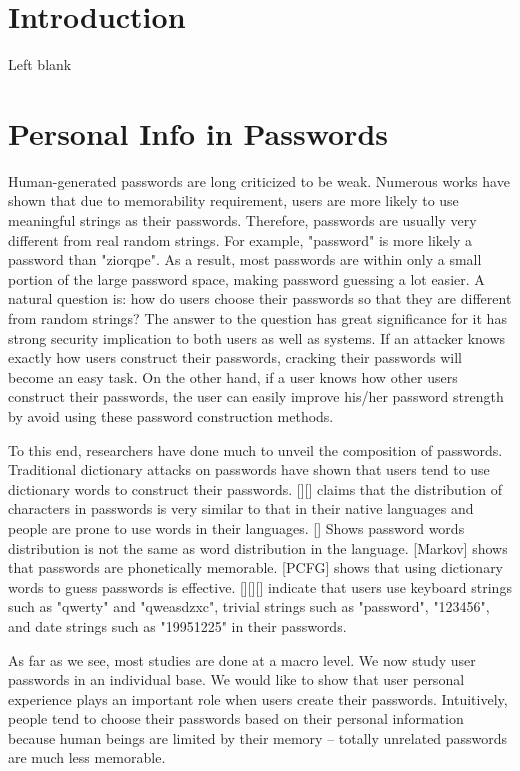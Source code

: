 \documentclass{sig-alternate}
\begin{document}


\section{Introduction}
Left blank

\section{Personal Info in Passwords}
Human-generated passwords are long criticized to be weak. Numerous works have shown that due to memorability requirement, users are more likely to use meaningful strings as their passwords. Therefore, passwords are usually very different from real random strings. For example, "password" is more likely a password than "ziorqpe". As a result, most passwords are within only a small portion of the large password space, making password guessing a lot easier. A natural question is: how do users choose their passwords so that they are different from random strings? The answer to the question has great significance for it has strong security implication to both users as well as systems. If an attacker knows exactly how users construct their passwords, cracking their passwords will become an easy task. On the other hand, if a user knows how other users construct their passwords, the user can easily improve his/her password strength by avoid using these password construction methods. 

To this end, researchers have done much to unveil the composition of passwords. Traditional dictionary attacks on passwords have shown that users tend to use dictionary words to construct their passwords. [][] claims that the distribution of characters in passwords is very similar to that in their native languages and people are prone to use words in their languages. [] Shows password words distribution is not the same as word distribution in the language. [Markov] shows that passwords are phonetically memorable. [PCFG] shows that using dictionary words to guess passwords is effective. [][][] indicate that users use keyboard strings such as "qwerty" and "qweasdzxc", trivial strings such as "password", "123456", and date strings such as "19951225" in their passwords.

As far as we see, most studies are done at a macro level. We now study user passwords in an individual base. We would like to show that user personal experience plays an important role when users create their passwords. Intuitively, people tend to choose their passwords based on their personal information because human beings are limited by their memory -- totally unrelated passwords are much less memorable.
 
\end{document}
